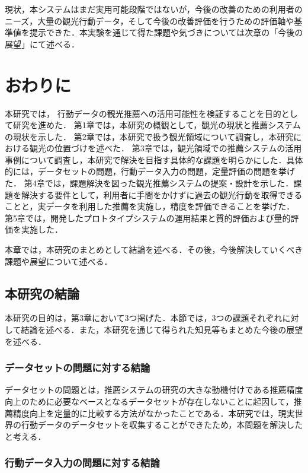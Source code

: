 \documentclass{jsarticle}
\begin{document}
現状，本システムはまだ実用可能段階ではないが，今後の改善のための利用者のニーズ，大量の観光行動データ，そして今後の改善評価を行うための評価軸や基準値を提示できた．本実験を通じて得た課題や気づきについては次章の「今後の展望」にて述べる．

\newpage
\section{おわりに}

本研究では， 行動データの観光推薦への活用可能性を検証することを目的として研究を進めた．
第1章では，本研究の概観として，観光の現状と推薦システムの現状を示した．
第2章では，本研究で扱う観光領域について調査し，本研究における観光の位置づけを述べた．
第3章では，観光領域での推薦システムの活用事例について調査し，本研究で解決を目指す具体的な課題を明らかにした．具体的には，データセットの問題，行動データ入力の問題，定量評価の問題を挙げた．
第4章では，課題解決を図った観光推薦システムの提案・設計を示した．課題を解決する要件として，利用者に手間をかけずに過去の観光行動を取得できることと，実データを利用した推薦を実施し，精度を評価できることを挙げた．
第5章では，開発したプロトタイプシステムの運用結果と質的評価および量的評価を実施した．

本章では，本研究のまとめとして結論を述べる．その後，今後解決していくべき課題や展望について述べる．

\newpage

\subsection{本研究の結論}

本研究の目的は，第3章において3つ掲げた．本節では，3つの課題それぞれに対して結論を述べる．また，本研究を通じて得られた知見等もまとめた今後の展望を述べる．

\subsubsection{データセットの問題に対する結論}

データセットの問題とは，推薦システムの研究の大きな動機付けである推薦精度向上のために必要なベースとなるデータセットが存在しないことに起因して，推薦精度向上を定量的に比較する方法がなかったことである．本研究では，現実世界の行動データのデータセットを収集することができたため，本問題を解決したと考える．

\subsubsection{行動データ入力の問題に対する結論}
\end{document}
